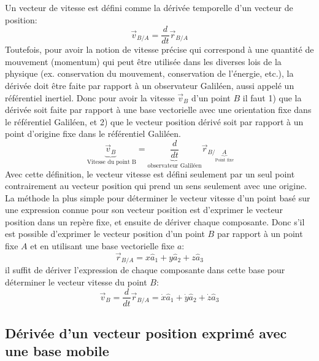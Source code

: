 Un vecteur de vitesse est défini comme la dérivée temporelle d'un vecteur de position:
\begin{equation}
	\vec{v}_{B/A} = \frac{d}{dt} \vec{r}_{B/A}
\end{equation}
Toutefois, pour avoir la notion de vitesse précise qui correspond à une quantité de mouvement (momentum) qui peut être utilisée dans les diverses lois de la physique (ex. conservation du mouvement, conservation de l'énergie, etc.), la dérivée doit être faite par rapport à un observateur Galiléen, aussi appelé un référentiel inertiel. Donc pour avoir la vitesse $\vec{v}_{B}$ d'un point $B$ il faut 1) que la dérivée soit faite par rapport à une base vectorielle avec une orientation fixe dans le référentiel Galiléen, et 2) que le vecteur position dérivé soit par rapport à un point d'origine fixe dans le référentiel Galiléen.
\begin{equation}
	\underbrace{
		\vec{v}_{B}
	}_{\text{ Vitesse du point B}}
	= \underbrace{
		\frac{d}{dt}
	}_{\text{observateur Galiléen}}
	\vec{r}_{B/
		\underbrace{A
		}_{\text{Point fixe}}
	}
\end{equation}
Avec cette définition, le vecteur vitesse est défini seulement par un seul point contrairement au vecteur position qui prend un sens seulement avec une origine.
La méthode la plus simple pour déterminer le vecteur vitesse d'un point basé sur une expression connue pour son vecteur position est d'exprimer le vecteur position dans un repère fixe, et ensuite de dériver chaque composante. Donc s’il est possible d'exprimer le vecteur position d'un point $B$ par rapport à un point fixe $A$ et en utilisant une base vectorielle fixe $a$:
\begin{equation}
	\vec{r}_{B/A} = x \hat{a}_1 +  y \hat{a}_2 +  z \hat{a}_3
\end{equation}
il suffit de dériver l'expression de chaque composante dans cette base pour déterminer le vecteur vitesse du point $B$:
\begin{equation}
	\vec{v}_{B} = \frac{d}{dt} \vec{r}_{B/A} =
	\dot{x} \hat{a}_1 +  \dot{y} \hat{a}_2 +  \dot{z} \hat{a}_3
\end{equation}

\subsection{Dérivée d'un vecteur position exprimé avec une base mobile}
\label{sec:diffposmobilebase}

